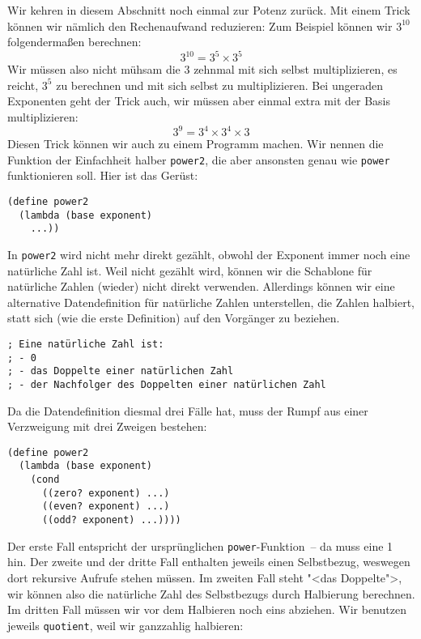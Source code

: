 Wir kehren in diesem Abschnitt noch einmal zur Potenz zurück.  Mit
einem Trick können wir nämlich den Rechenaufwand reduzieren: Zum
Beispiel können wir $3^{10}$ folgendermaßen berechnen:
%
\begin{displaymath}
  3^{10}   = 3^5 \times 3^5
\end{displaymath}
%
Wir müssen also nicht mühsam die 3 zehnmal mit sich selbst
multiplizieren, es reicht, $3^5$ zu berechnen und mit sich selbst zu
multiplizieren.  Bei ungeraden Exponenten geht der Trick auch, wir müssen aber einmal extra
mit der Basis multiplizieren:
%
\begin{displaymath}
  3^9   = 3^4 \times 3^4 \times 3
\end{displaymath}
%
Diesen Trick können wir auch zu einem Programm machen.  Wir nennen die
Funktion der Einfachheit halber \lstinline{power2}, die aber ansonsten
genau wie \lstinline{power} funktionieren soll.  Hier ist das Gerüst:
%
\begin{lstlisting}
(define power2
  (lambda (base exponent)
    ...))
\end{lstlisting}
%
In \lstinline{power2} wird nicht mehr direkt gezählt, obwohl der
Exponent immer noch eine natürliche Zahl ist.  Weil nicht gezählt
wird, können wir die Schablone für natürliche Zahlen (wieder) nicht
direkt verwenden.  Allerdings können wir eine alternative
Datendefinition für natürliche Zahlen unterstellen, die Zahlen
halbiert, statt sich (wie die erste Definition) auf den Vorgänger zu beziehen.
%
\begin{lstlisting}
; Eine natürliche Zahl ist:
; - 0
; - das Doppelte einer natürlichen Zahl
; - der Nachfolger des Doppelten einer natürlichen Zahl
\end{lstlisting}
%
Da die Datendefinition diesmal drei Fälle hat, muss der Rumpf aus
einer Verzweigung mit drei Zweigen bestehen:
%
\begin{lstlisting}
(define power2
  (lambda (base exponent)
    (cond
      ((zero? exponent) ...)
      ((even? exponent) ...)
      ((odd? exponent) ...))))
\end{lstlisting}
%
Der erste Fall entspricht der ursprünglichen
\lstinline{power}-Funktion~-- da muss eine 1 hin.  Der zweite und der
dritte Fall enthalten jeweils einen Selbstbezug, weswegen dort
rekursive Aufrufe stehen müssen.  Im zweiten Fall steht "<das
Doppelte">, wir können also die natürliche Zahl des Selbstbezugs durch
Halbierung berechnen.  Im dritten Fall müssen wir vor dem Halbieren
noch eins abziehen.  Wir benutzen jeweils \lstinline{quotient}, weil
wir ganzzahlig halbieren:
